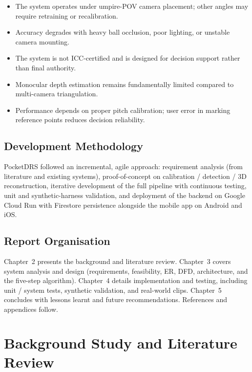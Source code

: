 \documentclass[12pt,a4paper]{report}
\begin{document}
\begin{itemize}
    \item The system operates under umpire-POV camera placement; other angles may require retraining or recalibration.
    \item Accuracy degrades with heavy ball occlusion, poor lighting, or unstable camera mounting.
    \item The system is not ICC-certified and is designed for decision support rather than final authority.
    \item Monocular depth estimation remains fundamentally limited compared to multi-camera triangulation.
    \item Performance depends on proper pitch calibration; user error in marking reference points reduces decision reliability.
\end{itemize}

\section{Development Methodology}

PocketDRS followed an incremental, agile approach: requirement analysis (from literature and existing systems), proof-of-concept on calibration / detection / 3D reconstruction, iterative development of the full pipeline with continuous testing, unit and synthetic-harness validation, and deployment of the backend on Google Cloud Run with Firestore persistence alongside the mobile app on Android and iOS.

\section{Report Organisation}

Chapter~2 presents the background and literature review. Chapter~3 covers system analysis and design (requirements, feasibility, ER, DFD, architecture, and the five-step algorithm). Chapter~4 details implementation and testing, including unit / system tests, synthetic validation, and real-world clips. Chapter~5 concludes with lessons learnt and future recommendations. References and appendices follow.

\chapter{Background Study and Literature Review}
\end{document}
